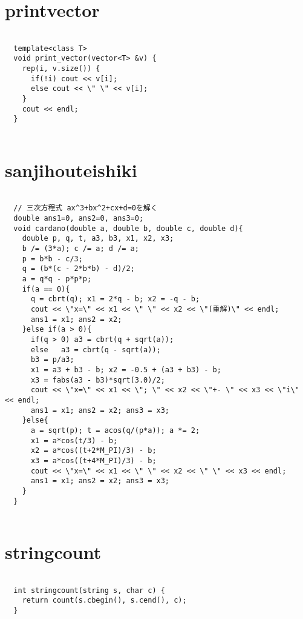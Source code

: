 \documentclass{jsarticle}
\begin{document}
\color{white}
\section{printvector}
\color{black}
\begin{lstlisting}[caption=printvector]

  template<class T>
  void print_vector(vector<T> &v) {
    rep(i, v.size()) {
      if(!i) cout << v[i];
      else cout << \" \" << v[i];
    }
    cout << endl;
  }
  

\end{lstlisting}

\color{white}
\section{sanjihouteishiki}
\color{black}
\begin{lstlisting}[caption=sanjihouteishiki]

  // 三次方程式 ax^3+bx^2+cx+d=0を解く 
  double ans1=0, ans2=0, ans3=0;
  void cardano(double a, double b, double c, double d){
    double p, q, t, a3, b3, x1, x2, x3;
    b /= (3*a); c /= a; d /= a;
    p = b*b - c/3;
    q = (b*(c - 2*b*b) - d)/2;
    a = q*q - p*p*p;
    if(a == 0){
      q = cbrt(q); x1 = 2*q - b; x2 = -q - b;
      cout << \"x=\" << x1 << \" \" << x2 << \"(重解)\" << endl;
      ans1 = x1; ans2 = x2;
    }else if(a > 0){
      if(q > 0) a3 = cbrt(q + sqrt(a));
      else   a3 = cbrt(q - sqrt(a));
      b3 = p/a3;
      x1 = a3 + b3 - b; x2 = -0.5 + (a3 + b3) - b;
      x3 = fabs(a3 - b3)*sqrt(3.0)/2;
      cout << \"x=\" << x1 << \"; \" << x2 << \"+- \" << x3 << \"i\" << endl;
      ans1 = x1; ans2 = x2; ans3 = x3;
    }else{
      a = sqrt(p); t = acos(q/(p*a)); a *= 2;
      x1 = a*cos(t/3) - b;
      x2 = a*cos((t+2*M_PI)/3) - b;
      x3 = a*cos((t+4*M_PI)/3) - b;
      cout << \"x=\" << x1 << \" \" << x2 << \" \" << x3 << endl;
      ans1 = x1; ans2 = x2; ans3 = x3;
    }
  }
  

\end{lstlisting}

\color{white}
\section{stringcount}
\color{black}
\begin{lstlisting}[caption=stringcount]

  int stringcount(string s, char c) {
    return count(s.cbegin(), s.cend(), c);
  }
  

\end{lstlisting}
\end{document}
